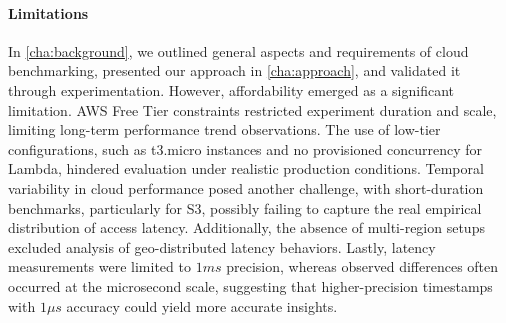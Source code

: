 \paragraph*{Limitations} In \cref{cha:background}, we outlined general aspects and requirements of cloud benchmarking, presented our approach in \cref{cha:approach}, and validated it through experimentation. However, affordability emerged as a significant limitation. AWS Free Tier constraints restricted experiment duration and scale, limiting long-term performance trend observations. The use of low-tier configurations, such as t3.micro instances and no provisioned concurrency for Lambda, hindered evaluation under realistic production conditions. Temporal variability in cloud performance posed another challenge, with short-duration benchmarks, particularly for S3, possibly failing to capture the real empirical distribution of access latency. Additionally, the absence of multi-region setups excluded analysis of geo-distributed latency behaviors. Lastly, latency measurements were limited to $1ms$ precision, whereas observed differences often occurred at the microsecond scale, suggesting that higher-precision timestamps with $1\mu s$ accuracy could yield more accurate insights.

